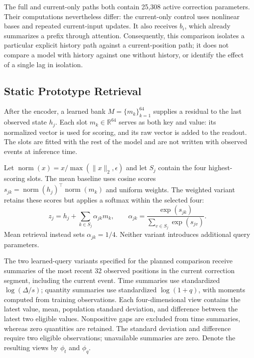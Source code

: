 \documentclass[runningheads]{llncs}
\newcommand{\Nrm}{\operatorname{norm}}
\begin{document}
The full and current-only paths both contain 25,308 active correction parameters. Their computations nevertheless differ: the current-only control uses nonlinear bases and repeated current-input updates. It also receives $b_i$, which already summarizes a prefix through attention. Consequently, this comparison isolates a particular explicit history path against a current-position path; it does not compare a model with history against one without history, or identify the effect of a single lag in isolation.

\subsection{Static Prototype Retrieval}
After the encoder, a learned bank $M=\{m_k\}_{k=1}^{64}$ supplies a residual to the last observed state $h_j$. Each slot $m_k\in\mathbb{R}^{64}$ serves as both key and value: its normalized vector is used for scoring, and its raw vector is added to the readout. The slots are fitted with the rest of the model and are not written with observed events at inference time.

Let $\Nrm(x)=x/\max(\|x\|_2,\epsilon)$ and let $S_j$ contain the four highest-scoring slots. The mean baseline uses cosine scores $s_{jk}=\Nrm(h_j)^\top\Nrm(m_k)$ and uniform weights. The weighted variant retains these scores but applies a softmax within the selected four:
\begin{equation}
 z_j=h_j+\sum_{k\in S_j}\alpha_{jk}m_k,\qquad
 \alpha_{jk}=\frac{\exp(s_{jk})}{\sum_{v\in S_j}\exp(s_{jv})}.
 \label{eq:readout}
\end{equation}
Mean retrieval instead sets $\alpha_{jk}=1/4$. Neither variant introduces additional query parameters.

The two learned-query variants specified for the planned comparison receive summaries of the most recent 32 observed positions in the current correction segment, including the current event. Time summaries use standardized $\log(\Delta/s)$; quantity summaries use standardized $\log(1+q)$, with moments computed from training observations. Each four-dimensional view contains the latest value, mean, population standard deviation, and difference between the latest two eligible values. Nonpositive gaps are excluded from time summaries, whereas zero quantities are retained. The standard deviation and difference require two eligible observations; unavailable summaries are zero. Denote the resulting views by $\phi_t$ and $\phi_q$.
\end{document}
